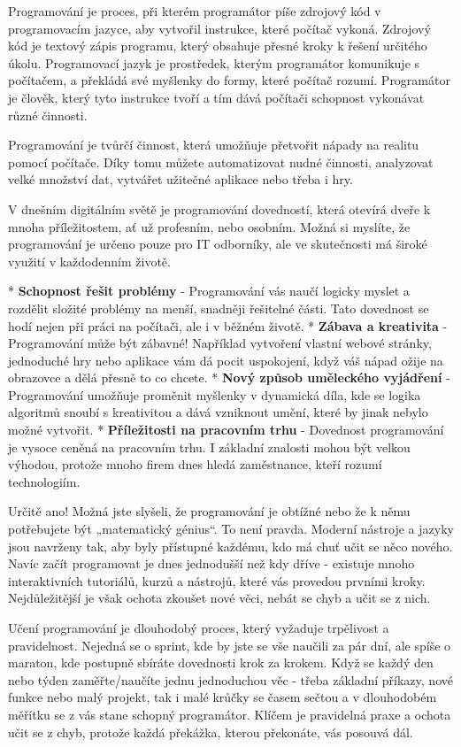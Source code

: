 Programování je proces, při kterém programátor píše zdrojový kód v programovacím jazyce, aby vytvořil instrukce, které počítač vykoná. Zdrojový kód je textový zápis programu, který obsahuje přesné kroky k řešení určitého úkolu. Programovací jazyk je prostředek, kterým programátor komunikuje s počítačem, a překládá své myšlenky do formy, které počítač rozumí. Programátor je člověk, který tyto instrukce tvoří a tím dává počítači schopnost vykonávat různé činnosti.

Programování je tvůrčí činnost, která umožňuje přetvořit nápady na realitu pomocí počítače. Díky tomu můžete automatizovat nudné činnosti, analyzovat velké množství dat, vytvářet užitečné aplikace nebo třeba i hry. 

V dnešním digitálním světě je programování dovedností, která otevírá dveře k mnoha příležitostem, ať už profesním, nebo osobním. Možná si myslíte, že programování je určeno pouze pro IT odborníky, ale ve skutečnosti má široké využití v každodenním životě.

\begitems
* {\bf Schopnost řešit problémy} - Programování vás naučí logicky myslet a rozdělit složité problémy na menší, snadněji řešitelné části. Tato dovednost se hodí nejen při práci na počítači, ale i v běžném životě.
* {\bf Zábava a kreativita} - Programování může být zábavné! Například vytvoření vlastní webové stránky, jednoduché hry nebo aplikace vám dá pocit uspokojení, když váš nápad ožije na obrazovce a dělá přesně to co chcete.
* {\bf Nový způsob uměleckého vyjádření} - Programování umožňuje proměnit myšlenky v dynamická díla, kde se logika algoritmů snoubí s kreativitou a dává vzniknout umění, které by jinak nebylo možné vytvořit.
* {\bf Příležitosti na pracovním trhu} - Dovednost programování je vysoce ceněná na pracovním trhu. I základní znalosti mohou být velkou výhodou, protože mnoho firem dnes hledá zaměstnance, kteří rozumí technologiím.
\enditems

Určitě ano! Možná jste slyšeli, že programování je obtížné nebo že k němu potřebujete být „matematický génius“. To není pravda. Moderní nástroje a jazyky jsou navrženy tak, aby byly přístupné každému, kdo má chuť učit se něco nového.
Navíc začít programovat je dnes jednodušší než kdy dříve - existuje mnoho interaktivních tutoriálů, kurzů a nástrojů, které vás provedou prvními kroky. Nejdůležitější je však ochota zkoušet nové věci, nebát se chyb a učit se z nich.

Učení programování je dlouhodobý proces, který vyžaduje trpělivost a pravidelnost. Nejedná se o sprint, kde by jste se vše naučili za pár dní, ale spíše o maraton, kde postupně sbíráte dovednosti krok za krokem. Když se každý den nebo týden zaměřte/naučíte jednu jednoduchou věc - třeba základní příkazy, nové funkce nebo malý projekt, tak i malé krůčky se časem sečtou a v dlouhodobém měřítku se z vás stane schopný programátor. Klíčem je pravidelná praxe a ochota učit se z chyb, protože každá překážka, kterou překonáte, vás posouvá dál.

